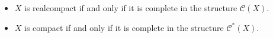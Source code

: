 \begin{itemize}
\item[(a)] $X$ is realcompact if and only if it is complete in the structure $\mathcal{C}(X)$.
\item[(a*)] $X$ is compact if and only if it is complete in the structure $\mathcal{C}^*(X)$.
\end{itemize}
